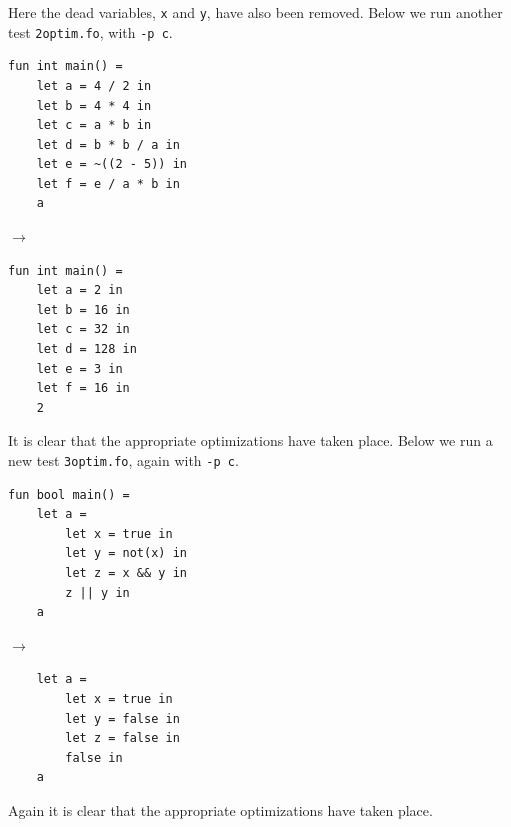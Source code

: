 \documentclass[11pt]{article}
\begin{document}
	Here the dead variables, \texttt{x} and \texttt{y}, have also been removed. Below we run another test \texttt{2optim.fo},
	with \texttt{-p c}. \\
	\begin{center}
	\begin{minipage}{.5\textwidth}
	\begin{lstlisting}
fun int main() =
    let a = 4 / 2 in
    let b = 4 * 4 in
    let c = a * b in
    let d = b * b / a in
    let e = ~((2 - 5)) in
    let f = e / a * b in
    a
	\end{lstlisting}
	\end{minipage}%
	\begin{minipage}{.1\textwidth}
	$\rightarrow$
	\end{minipage}%
	\begin{minipage}{.4\textwidth}
	\begin{lstlisting}
fun int main() =
    let a = 2 in
    let b = 16 in
    let c = 32 in
    let d = 128 in
    let e = 3 in
    let f = 16 in
    2
	\end{lstlisting}
	\end{minipage}
	\end{center}
	It is clear that the appropriate optimizations have taken place. Below we run a new test \texttt{3optim.fo}, again with \texttt{-p c}.
	\begin{center}
	\begin{minipage}{.5\textwidth}
	\begin{lstlisting}
fun bool main() =
    let a =
        let x = true in
        let y = not(x) in
        let z = x && y in
        z || y in
    a
	\end{lstlisting}
	\end{minipage}%
	\begin{minipage}{.1\textwidth}
	$\rightarrow$
	\end{minipage}%
	\begin{minipage}{.4\textwidth}
	\begin{lstlisting}
    let a =
        let x = true in
        let y = false in
        let z = false in
        false in
    a
	\end{lstlisting}
	\end{minipage}
	\end{center}
	Again it is clear that the appropriate optimizations have taken place.

    \newpage
    \appendix
\end{document}
